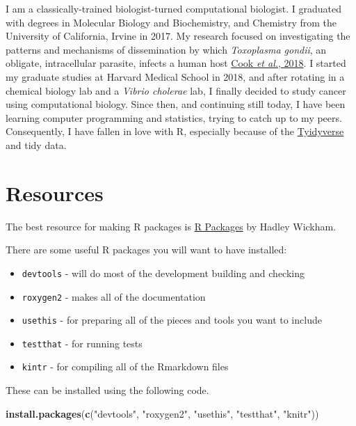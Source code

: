 \documentclass[]{book}
\newenvironment{Shaded}{\begin{snugshade}}{\end{snugshade}}
\newcommand{\KeywordTok}[1]{\textcolor[rgb]{0.13,0.29,0.53}{\textbf{#1}}}
\newcommand{\StringTok}[1]{\textcolor[rgb]{0.31,0.60,0.02}{#1}}
\newcommand{\NormalTok}[1]{#1}
\providecommand{\tightlist}{%
  \setlength{\itemsep}{0pt}\setlength{\parskip}{0pt}}
\begin{document}
I am a classically-trained biologist-turned computational biologist. I
graduated with degrees in Molecular Biology and Biochemistry, and
Chemistry from the University of California, Irvine in 2017. My research
focused on investigating the patterns and mechanisms of dissemination by
which \emph{Toxoplasma gondii}, an obligate, intracellular parasite,
infects a human host
\href{https://www.ncbi.nlm.nih.gov/pubmed/29295815}{Cook \emph{et al.},
2018}. I started my graduate studies at Harvard Medical School in 2018,
and after rotating in a chemical biology lab and a \emph{Vibrio
cholerae} lab, I finally decided to study cancer using computational
biology. Since then, and continuing still today, I have been learning
computer programming and statistics, trying to catch up to my peers.
Consequently, I have fallen in love with R, especially because of the
\href{https://www.tidyverse.org}{Tyidyverse} and tidy data.

\section*{Resources}\label{resources}

The best resource for making R packages is
\href{http://r-pkgs.had.co.nz}{R Packages} by Hadley Wickham.

There are some useful R packages you will want to have installed:

\begin{itemize}
\tightlist
\item
  \texttt{devtools} - will do most of the development building and
  checking
\item
  \texttt{roxygen2} - makes all of the documentation
\item
  \texttt{usethis} - for preparing all of the pieces and tools you want
  to include
\item
  \texttt{testthat} - for running tests
\item
  \texttt{kintr} - for compiling all of the Rmarkdown files
\end{itemize}

These can be installed using the following code.

\begin{Shaded}
\begin{Highlighting}[]
\KeywordTok{install.packages}\NormalTok{(}\KeywordTok{c}\NormalTok{(}\StringTok{"devtools"}\NormalTok{, }\StringTok{"roxygen2"}\NormalTok{, }\StringTok{"usethis"}\NormalTok{, }\StringTok{"testthat"}\NormalTok{, }\StringTok{"knitr"}\NormalTok{))}
\end{Highlighting}
\end{Shaded}
\end{document}

